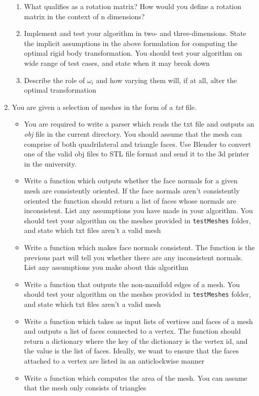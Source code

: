 \documentclass[a4paper, 11pt]{article}
\begin{document}
\begin{enumerate}
\begin{enumerate}[label=\alph*.]
    \item What qualifies as a rotation matrix? How would you define a rotation matrix in the context of n dimensions? 
    
    \item Implement and test your algorithm in two- and three-dimensions. State the implicit assumptions in the above formulation for computing the optimal rigid body transformation. You should test your algorithm on wide range of test cases, and state when it may break down

    \item Describe the role of $\omega_i$ and how varying them will, if at all, alter the optimal transformation 
    
    
\end{enumerate}


\item You are given a selection of meshes in the form of a \textit{txt} file. 
\begin{itemize}
    \item You are required to write a parser which reads the txt file and outputs an \textit{obj} file in the current directory. You should assume that the mesh can comprise of both quadrilateral and triangle faces. Use Blender to convert one of the valid obj files to STL file format and send it to the 3d printer in the university.
    \item Write a function which outputs whether the face normals for a given mesh are consistently oriented. If the face normals aren't consistently oriented the function should return a list of faces whose normals are inconsistent. List any assumptions you have made in your algorithm. You should test your algorithm on the meshes provided in \texttt{testMeshes} folder, and state which txt files aren't a valid mesh
    \item Write a function which makes face normals consistent. The function is the previous part will tell you whether there are any inconsistent normals. List any assumptions you make about this algorithm 
    \item  Write a function that outputs the non-manifold edges of a mesh. You should test your algorithm on the meshes provided in \texttt{testMeshes} folder, and state which txt files aren't a valid mesh
    \item Write a function which takes as input lists of vertices and faces of a mesh and outputs a list of faces connected to a vertex. The function should return a dictionary where the key of the dictionary is the vertex id, and the value is the list of faces. Ideally, we want to ensure that the faces attached to a vertex are listed in an anticlockwise manner
    \item Write a function which computes the area of the mesh. You can assume that the mesh only consists of triangles
\end{itemize}


\end{enumerate}
\end{document}
